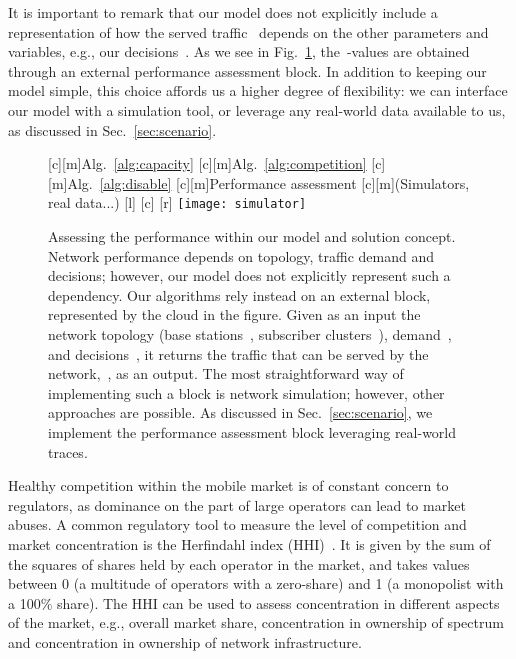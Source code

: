 \documentclass[10pt,journal,cspaper,compsoc]{IEEEtran}
\newcommand{\Fig}[1]{Fig.~\ref{fig:#1}}
\newcommand{\Sec}[1]{Sec.~\ref{sec:#1}}
\newcommand{\Alg}[1]{Alg.~\ref{alg:#1}}
\begin{document}
It is important to remark that our model does not explicitly include a representation of how the served traffic~ depends
on the other parameters and variables, e.g., our decisions~.
As we see in \Fig{simulator}, the~-values are obtained through an external performance assessment block.
In addition to keeping our model simple, this
choice affords us a higher degree of flexibility: we can interface our model with a simulation tool, or leverage any real-world data available to us, as discussed in \Sec{scenario}.
\begin{figure}[t!]
[c][m]{\textsf{\Alg{capacity}}}
[c][m]{\textsf{\Alg{competition}}}
[c][m]{\textsf{\Alg{disable}}}
[c][m]{\textsf{Performance assessment}}
[c][m]{\footnotesize{\textsf{(Simulators, real data...)}}}
[l]{\footnotesize{}}
[c]{\footnotesize{}}
[r]{\footnotesize{}}
\centering
	\texttt{[image: simulator]}
	\caption{
	Assessing the performance within our model and solution concept.
	Network performance depends on topology, traffic demand
	and decisions; however, our model does not explicitly represent
	such a dependency.
	Our algorithms rely instead on an external block, represented by the cloud in the figure. Given as an input the network topology
	(base stations~, subscriber clusters~), demand~, and decisions~, it returns
	the traffic that can be served by the network,~, as an output.
	The most straightforward way of implementing such a block is network simulation;
	however, other approaches are possible. As discussed in \Sec{scenario}, we implement
	the performance assessment block leveraging real-world traces.
	}
	\label{fig:simulator}
\end{figure}

Healthy competition within the mobile market is of constant concern to regulators, as
dominance on the part of large operators can lead to market abuses. A common regulatory
tool to measure the level of competition and market concentration is the Herfindahl index
(HHI)~\cite{mergers, EULaw}. It is given by the sum of the squares of shares held by each
operator in the market, and takes values between 0 (a multitude of operators with a zero-share)
and 1 (a monopolist with a 100\% share).
The HHI can be used to assess concentration in different aspects of the market, e.g.,
overall market share, concentration in ownership of spectrum and concentration
in ownership of network infrastructure.
\end{document}
